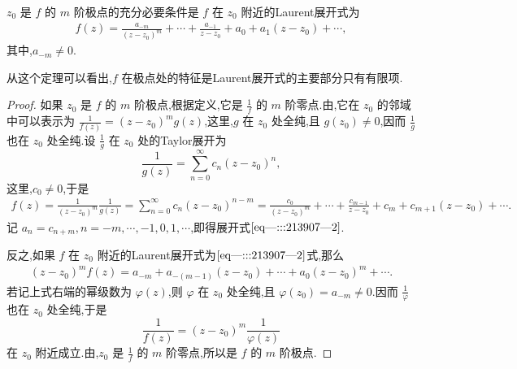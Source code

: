 \documentclass[../../main.tex]{subfiles}
\begin{document}
\begin{theorem}\label{theorem:定理5.2.4}
\( z_0 \) 是 \( f \) 的 \( m \) 阶极点的充分必要条件是 \( f \) 在 \( z_0 \) 附近的Laurent展开式为
\begin{align}
f(z) = \frac{a_{-m}}{(z - z_0)^m} + \cdots + \frac{a_{-1}}{z - z_0} + a_0 + a_1(z - z_0) + \cdots, \label{eq---:::213907---2}
\end{align}
其中,\( a_{-m} \neq 0 \).
\end{theorem}
\begin{remark}
从这个定理可以看出,\( f \) 在极点处的特征是Laurent展开式的主要部分只有有限项.
\end{remark}
\begin{proof}
如果 \( z_0 \) 是 \( f \) 的 \( m \) 阶极点,根据定义,它是 \( \frac{1}{f} \) 的 \( m \) 阶零点.由,它在 \( z_0 \) 的邻域中可以表示为 \( \frac{1}{f(z)} = (z - z_0)^m g(z) \),这里,\( g \) 在 \( z_0 \) 处全纯,且 \( g(z_0) \neq 0 \),因而 \( \frac{1}{g} \) 也在 \( z_0 \) 处全纯.设 \( \frac{1}{g} \) 在 \( z_0 \) 处的Taylor展开为
\[
\frac{1}{g(z)} = \sum_{n=0}^{\infty} c_n (z - z_0)^n,
\]
这里,\( c_0 \neq 0 \),于是
\begin{align*}
f(z) = \frac{1}{(z - z_0)^m} \frac{1}{g(z)} = \sum_{n=0}^{\infty} c_n (z - z_0)^{n - m} = \frac{c_0}{(z - z_0)^m} + \cdots + \frac{c_{m - 1}}{z - z_0} + c_m + c_{m + 1}(z - z_0) + \cdots.
\end{align*}
记 \( a_n = c_{n + m}, n = -m, \cdots, -1, 0, 1, \cdots \),即得展开式\(\eqref{eq---:::213907---2}\).

反之,如果 \( f \) 在 \( z_0 \) 附近的Laurent展开式为\(\eqref{eq---:::213907---2}\)式,那么
\begin{align*}
(z - z_0)^m f(z) = a_{-m} + a_{-(m - 1)}(z - z_0) + \cdots + a_0(z - z_0)^m + \cdots.
\end{align*}
若记上式右端的幂级数为 \( \varphi(z) \),则 \( \varphi \) 在 \( z_0 \) 处全纯,且 \( \varphi(z_0) = a_{-m} \neq 0 \).因而 \( \frac{1}{\varphi} \) 也在 \( z_0 \) 处全纯,于是
\[
\frac{1}{f(z)} = (z - z_0)^m \frac{1}{\varphi(z)}
\]
在 \( z_0 \) 附近成立.由,\( z_0 \) 是 \( \frac{1}{f} \) 的 \( m \) 阶零点,所以是 \( f \) 的 \( m \) 阶极点.
\end{proof}
\end{document}

